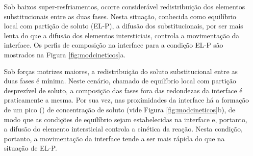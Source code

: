 Sob baixos super-resfriamentos, ocorre considerável redistribuição dos elementos substitucionais entre as duas fases. Nesta situação, conhecida como equilíbrio local com partição de soluto (EL-P), a difusão dos substitucionais, por ser mais lenta do que a difusão dos elementos intersticiais, controla a movimentação da interface. Os perfis de composição na interface para a condição EL-P são mostrados na Figura \ref{fig:modcineticos}a.

Sob forças motrizes maiores, a redistribuição do soluto substitucional entre as duas fases é mínima. Neste cenário, chamado de equilíbrio local com partição desprezível de soluto, a composição das fases fora das redondezas da interface é praticamente a mesma. Por sua vez, nas proximidades da interface há a formação de um pico () de concentração de soluto (vide Figura \ref{fig:modcineticos}b), de modo que as condições de equilíbrio sejam estabelecidas na interface e, portanto, a difusão do elemento intersticial controla a cinética da reação. Nesta condição, portanto, a movimentação da interface tende a ser mais rápida do que na situação de EL-P. %

